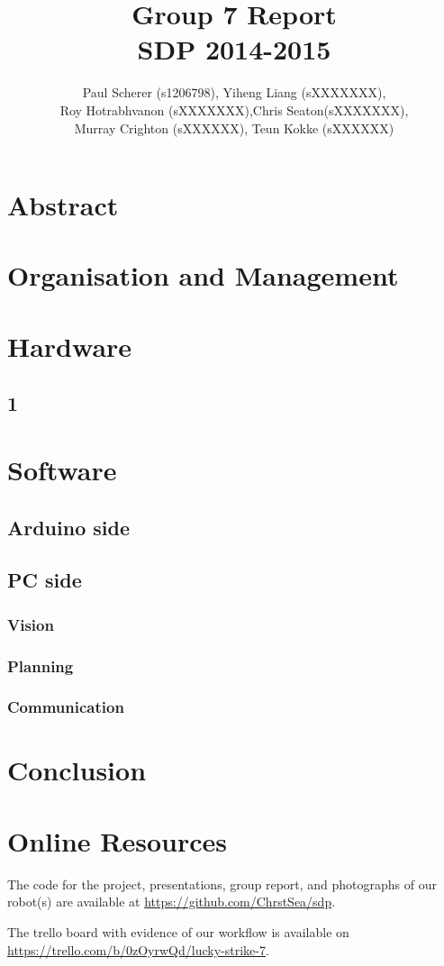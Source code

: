 \documentclass[12pt,a4paper]{article}
\begin{document}
\title{Group 7 Report\\
		SDP 2014-2015}
\author{Paul Scherer (s1206798), Yiheng Liang (sXXXXXXX),\\ Roy Hotrabhvanon (sXXXXXXX),Chris Seaton(sXXXXXXX),\\ Murray Crighton (sXXXXXX), Teun Kokke (sXXXXXX)}
\maketitle

\section{Abstract}

\section{Organisation and Management}

\section{Hardware}
\subsection{1}


\section{Software}
\subsection{Arduino side}

\subsection{PC side}
\subsubsection{Vision}
\subsubsection{Planning}
\subsubsection{Communication}

\section{Conclusion}

\section{Online Resources}
The code for the project, presentations, group report, and photographs of our robot(s) are available at \url{https://github.com/ChrstSea/sdp}.

The trello board with evidence of our workflow is available on \url{https://trello.com/b/0zOyrwQd/lucky-strike-7}.
\end{document}
